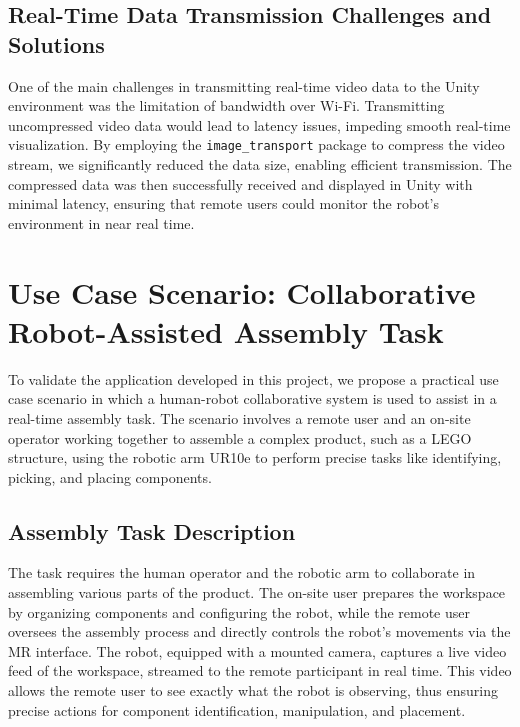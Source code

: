     \subsection{Real-Time Data Transmission Challenges and Solutions}

    One of the main challenges in transmitting real-time video data to the Unity environment was the limitation of bandwidth over Wi-Fi. Transmitting uncompressed video data would lead to latency issues, impeding smooth real-time visualization. By employing the \texttt{image\_transport} package to compress the video stream, we significantly reduced the data size, enabling efficient transmission. The compressed data was then successfully received and displayed in Unity with minimal latency, ensuring that remote users could monitor the robot’s environment in near real time.


    \section{Use Case Scenario: Collaborative Robot-Assisted Assembly Task}
    \label{sec:use_case}
    
    To validate the application developed in this project, we propose a practical use case scenario in which a human-robot collaborative system is used to assist in a real-time assembly task. The scenario involves a remote user and an on-site operator working together to assemble a complex product, such as a LEGO structure, using the robotic arm UR10e to perform precise tasks like identifying, picking, and placing components.
    
    \subsection{Assembly Task Description}
    The task requires the human operator and the robotic arm to collaborate in assembling various parts of the product. The on-site user prepares the workspace by organizing components and configuring the robot, while the remote user oversees the assembly process and directly controls the robot's movements via the \ac{MR} interface. The robot, equipped with a mounted camera, captures a live video feed of the workspace, streamed to the remote participant in real time. This video allows the remote user to see exactly what the robot is observing, thus ensuring precise actions for component identification, manipulation, and placement.
    
